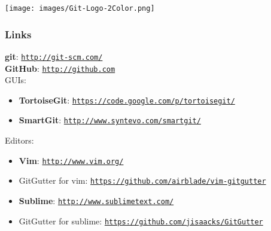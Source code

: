 \documentclass{beamer}
\begin{document}
\begin{frame}[t]
    \vspace{20mm}
    \texttt{[image: images/Git-Logo-2Color.png]}
\end{frame}

%


\begin{frame}
    \frametitle{Links}
    \textbf{git}: \texttt{\url{http://git-scm.com/}}\\
    \textbf{GitHub}: \texttt{\url{http://github.com}}\\
    \medskip
    GUIs:
    \begin{itemize}
        \item \textbf{TortoiseGit}: \texttt{\url{https://code.google.com/p/tortoisegit/}}
        \item \textbf{SmartGit}: \texttt{\url{http://www.syntevo.com/smartgit/}}
    \end{itemize}
    \medskip
    Editors:
    \begin{itemize}
        \item \textbf{Vim}: \texttt{\url{http://www.vim.org/}}
        \item GitGutter for vim: \texttt{\url{https://github.com/airblade/vim-gitgutter}}
        \item \textbf{Sublime}: \texttt{\url{http://www.sublimetext.com/}}
        \item GitGutter for sublime: \texttt{\url{https://github.com/jisaacks/GitGutter}}
    \end{itemize}
\end{frame}
\end{document}
